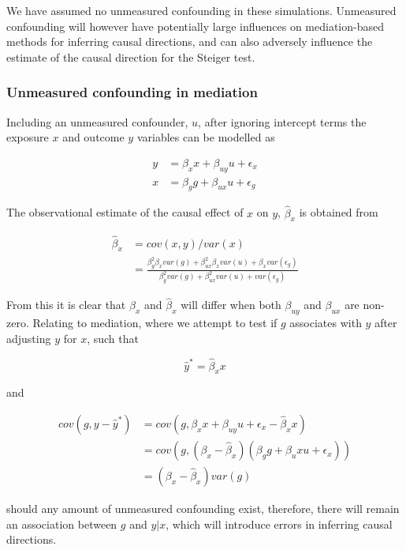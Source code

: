 \documentclass[]{article}
\begin{document}
We have assumed no unmeasured confounding in these simulations.
Unmeasured confounding will however have potentially large influences on
mediation-based methods for inferring causal directions, and can also
adversely influence the estimate of the causal direction for the Steiger
test.

\subsubsection{Unmeasured confounding in
mediation}\label{unmeasured-confounding-in-mediation}

Including an unmeasured confounder, \(u\), after ignoring intercept
terms the exposure \(x\) and outcome \(y\) variables can be modelled as

\[
\begin{aligned}
y & = \beta_x x + \beta_{uy} u + \epsilon_x \\
x & = \beta_g g + \beta_{ux} u + \epsilon_g
\end{aligned}
\]

The observational estimate of the causal effect of \(x\) on \(y\),
\(\hat{\beta}_x\) is obtained from

\[
\begin{aligned}
\hat{\beta}_x & = cov(x, y) / var(x) \\
& = \frac{\beta_g^2 \beta_x var(g) + \beta_{ux}^2 \beta_x var(u) + \beta_x var(\epsilon_g)} {\beta_g^2 var(g) + \beta_{ux}^2 var(u) + var(\epsilon_g)}
\end{aligned}
\]

From this it is clear that \(\beta_x\) and \(\hat{\beta}_x\) will differ
when both \(\beta_{uy}\) and \(\beta_{ux}\) are non-zero. Relating to
mediation, where we attempt to test if \(g\) associates with \(y\) after
adjusting \(y\) for \(x\), such that

\[
\hat{y}^* = \hat{\beta}_x x
\]

and

\[
\begin{aligned}
cov(g, y - \hat{y}^*) & = cov(g, \beta_x x + \beta_{uy} u + \epsilon_x - \hat{\beta}_x x) \\
& = cov(g, (\beta_x - \hat{\beta}_x)(\beta_g g + \beta_ux u + \epsilon_x)) \\
& = (\beta_x - \hat{\beta}_x) var(g)
\end{aligned}
\]

should any amount of unmeasured confounding exist, therefore, there will
remain an association between \(g\) and \(y|x\), which will introduce
errors in inferring causal directions.
\end{document}
